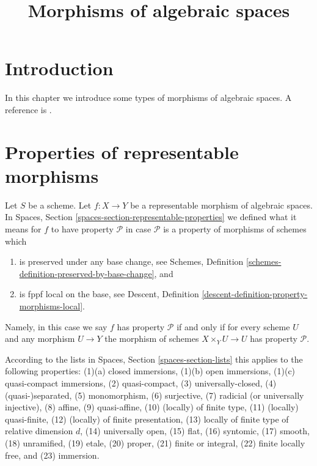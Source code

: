 

%


\title{Morphisms of algebraic spaces}


\maketitle

\label{section-phantom}

\tableofcontents

\section{Introduction}
\label{section-introduction}

\noindent
In this chapter we introduce some types of morphisms of algebraic spaces.
A reference is \cite{Kn}.



\section{Properties of representable morphisms}
\label{section-representable}

\noindent
Let $S$ be a scheme.
Let $f : X \to Y$ be a representable morphism of algebraic spaces. In
Spaces, Section \ref{spaces-section-representable-properties}
we defined what it means for $f$ to
have property $\mathcal{P}$ in case $\mathcal{P}$ is a property
of morphisms of schemes which
\begin{enumerate}
\item is preserved under any base change,
see Schemes, Definition \ref{schemes-definition-preserved-by-base-change},
and
\item is fppf local on the base, see
Descent, Definition \ref{descent-definition-property-morphisms-local}.
\end{enumerate}
Namely, in this case we say $f$ has property $\mathcal{P}$ if and only
if for every scheme $U$ and any morphism $U \to Y$ the morphism of schemes
$X \times_Y U \to U$ has property $\mathcal{P}$.

\medskip\noindent
According to the lists in
Spaces, Section \ref{spaces-section-lists}
this applies to the following properties:
(1)(a) closed immersions,
(1)(b) open immersions,
(1)(c) quasi-compact immersions,
(2) quasi-compact,
(3) universally-closed,
(4) (quasi-)separated,
(5) monomorphism,
(6) surjective,
(7) radicial (or universally injective),
(8) affine,
(9) quasi-affine,
(10) (locally) of finite type,
(11) (locally) quasi-finite,
(12) (locally) of finite presentation,
(13) locally of finite type of relative dimension $d$,
(14) universally open,
(15) flat,
(16) syntomic,
(17) smooth,
(18) unramified,
(19) etale,
(20) proper,
(21) finite or integral,
(22) finite locally free, and
(23) immersion.

